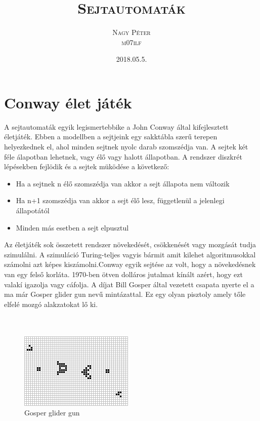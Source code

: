 \documentclass[paper=a4, fontsize=11pt]{article}
\title{\scshape\Huge Sejtautomaták }
\date{\scshape\Large 2018.05.5.}
\author{\scshape\huge Nagy Péter\\\scshape\huge m07ilf}
\begin{document}
\maketitle
\newpage

 
\tableofcontents
\newpage




\section{Conway élet játék}
A sejtautomaták egyik legismertebbike a John Conway által kifejlesztett életjáték. Ebben a modellben a sejtjeink egy sakktábla szerű terepen helyezkednek el, ahol minden sejtnek nyolc darab szomszédja van. A sejtek két féle álapotban lehetnek, vagy élő vagy halott állapotban. A rendszer diszkrét lépésekben fejlödik és a sejtek müködése a következő:

\begin{itemize}
\item Ha a sejtnek n élő szomszédja van akkor a sejt állapota nem változik
\item Ha n+1 szomszédja van akkor a sejt élő lesz, függetlenül a jelenlegi állapotától
\item Minden más esetben a sejt elpusztul
\end{itemize}


Az életjáték sok összetett rendszer növekedését, csökkenését vagy mozgását tudja szimulálni. 
A szimuláció Turing-teljes vagyis bármit amit kilehet algoritmusokkal számolni azt képes kiszámolni.Conway egyik sejtése az volt, hogy a növekedésnek van egy felső korláta. 1970-ben ötven dolláros jutalmat kínált azért, hogy ezt valakí igazolja vagy cáfolja. A díjat Bill Gosper által vezetett csapata nyerte el a ma már Gosper glider gun nevű mintázattal. Ez egy olyan pisztoly amely tőle elfelé mozgó alakzatokat lő ki.
\\
\\
\\

\begin{figure}[H]
    \centering
    \includegraphics[width=\textwidth]{Gosperglidergun_destruct}
    \caption{Gosper glider gun}
\end{figure}
\end{document}
